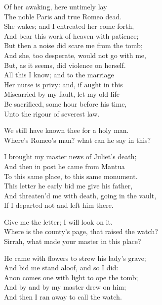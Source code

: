\begin{speech}
Of her awaking, here untimely lay \\
The noble Paris and true Romeo dead. \\
She wakes; and I entreated her come forth, \\
And bear this work of heaven with patience; \\
But then a noise did scare me from the tomb; \\
And she, too desperate, would not go with me, \\
But, as it seems, did violence on herself. \\
All this I know; and to the marriage \\
Her nurse is privy: and, if aught in this \\
Miscarried by my fault, let my old life \\
Be sacrificed, some hour before his time, \\
Unto the rigour of severest law. \\
\end{speech}
\begin{speech}
We still have known thee for a holy man. \\
Where's Romeo's man? what can he say in this? \\
\end{speech}
\begin{speech}
I brought my master news of Juliet's death; \\
And then in post he came from Mantua \\
To this same place, to this same monument. \\
This letter he early bid me give his father, \\
And threaten'd me with death, going in the vault, \\
If I departed not and left him there. \\
\end{speech}
\begin{speech}
Give me the letter; I will look on it. \\
Where is the county's page, that raised the watch? \\
Sirrah, what made your master in this place? \\
\end{speech}
\begin{speech}
He came with flowers to strew his lady's grave; \\

And bid me stand aloof, and so I did: \\
Anon comes one with light to ope the tomb; \\
And by and by my master drew on him; \\
And then I ran away to call the watch. \\
\end{speech}
